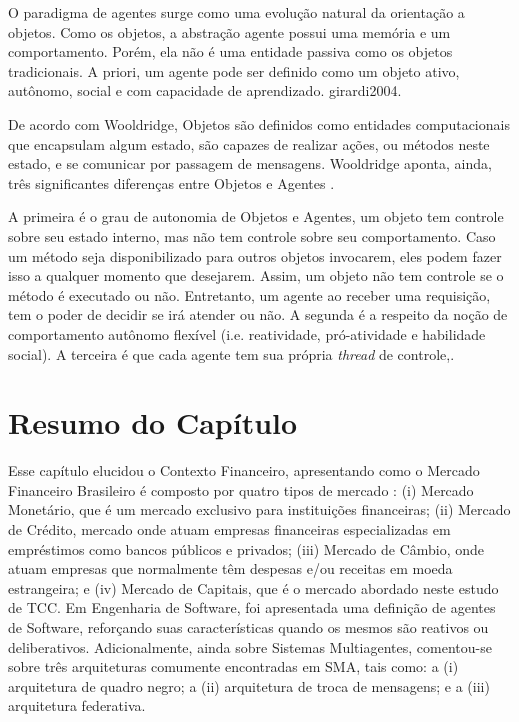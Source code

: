 O paradigma de agentes surge como uma evolução natural da orientação a objetos. Como os objetos, a abstração agente possui uma memória e um comportamento. Porém, ela não é uma entidade passiva como os objetos tradicionais. A priori, um agente pode ser definido como um objeto ativo, autônomo, social e com capacidade de aprendizado. 
\newline {} {girardi2004}.


De acordo com Wooldridge, Objetos são definidos como entidades computacionais que encapsulam algum estado, são capazes de realizar ações, ou métodos neste estado, e se comunicar por passagem de mensagens. Wooldridge aponta, ainda, três significantes diferenças entre Objetos e Agentes \cite[p. 25-27]{wooldrige2002}. 

A primeira é o grau de autonomia de Objetos e Agentes, um objeto tem controle sobre seu estado interno, mas não tem controle sobre seu comportamento. Caso um método seja disponibilizado para outros objetos invocarem, eles podem fazer isso a qualquer momento que desejarem. Assim, um objeto não tem controle se o método é executado ou não. Entretanto, um agente ao receber uma requisição, tem o poder de decidir se irá atender ou não. A segunda é a respeito da noção de comportamento autônomo flexível (i.e. reatividade, pró-atividade e habilidade social). A terceira é que cada agente tem sua própria \textit{thread} de controle,\cite[p. 25-27]{wooldrige2002}.


\section{Resumo do Capítulo}

Esse capítulo elucidou o Contexto Financeiro, apresentando como o Mercado Financeiro Brasileiro é composto por quatro tipos de mercado \cite[p. 15]{cmv2014}: (i) Mercado Monetário, que é um mercado exclusivo para instituições financeiras; (ii) Mercado de Crédito, mercado onde atuam empresas financeiras especializadas em empréstimos como bancos públicos e privados; (iii) Mercado de Câmbio, onde atuam empresas que normalmente têm despesas e/ou receitas em moeda estrangeira; e (iv) Mercado de Capitais, que é o mercado abordado neste estudo de TCC. Em Engenharia de Software, foi apresentada uma definição de agentes de Software, reforçando suas características quando os mesmos são reativos ou deliberativos. Adicionalmente, ainda sobre Sistemas Multiagentes, comentou-se sobre três arquiteturas comumente encontradas em SMA, tais como: a (i) arquitetura de quadro negro; a (ii) arquitetura de troca de mensagens; e a (iii) arquitetura federativa.
\newpage
\FloatBarrier
